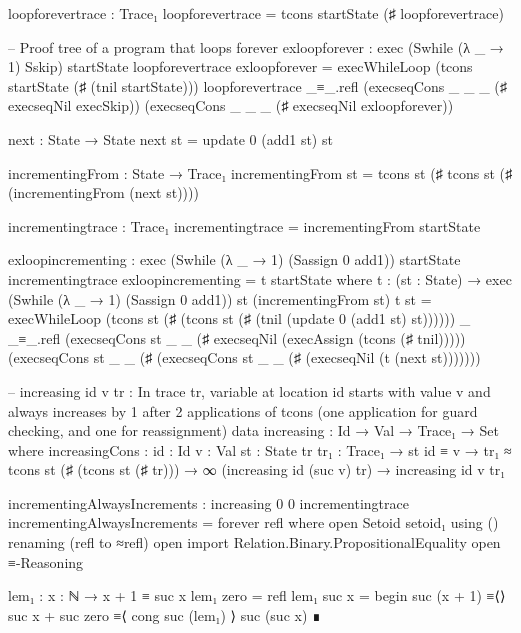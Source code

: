         loopforevertrace : Trace₁
        loopforevertrace = tcons startState (♯ loopforevertrace)
        
        -- Proof tree of a program that loops forever
        exloopforever : exec (Swhile (λ _ → 1) Sskip) startState loopforevertrace
        exloopforever = execWhileLoop 
            (tcons startState (♯ (tnil startState))) 
            loopforevertrace
            _≡_.refl 
            (execseqCons _ _ _ (♯ execseqNil execSkip))
            (execseqCons _ _ _ (♯ execseqNil exloopforever))

        next : State → State
        next st = update 0 (add1 st) st

        incrementingFrom : State → Trace₁
        incrementingFrom st = tcons st (♯ tcons st (♯ (incrementingFrom (next st))))

        incrementingtrace : Trace₁
        incrementingtrace = incrementingFrom startState

        exloopincrementing : exec (Swhile (λ _ → 1) (Sassign 0 add1)) startState incrementingtrace
        exloopincrementing = t startState
            where
                t : (st : State) → exec (Swhile (λ _ → 1) (Sassign 0 add1)) st (incrementingFrom st)
                t st = execWhileLoop 
                    (tcons st (♯ (tcons st (♯ (tnil (update 0 (add1 st) st)))))) 
                    _ 
                    _≡_.refl 
                    (execseqCons st _ _ (♯ execseqNil (execAssign (tcons (♯ tnil)))))
                    (execseqCons st _ _ (♯ (execseqCons st _ _ (♯ (execseqNil (t (next st)))))))


        -- increasing id v tr : In trace tr, variable at location id starts with value v and always increases by 1 after 2 applications of tcons (one application for guard checking, and one for reassignment)
        data increasing : Id → Val → Trace₁ → Set where
            increasingCons : {id : Id} {v : Val} {st : State} {tr tr₁ : Trace₁} 
                → st id ≡ v 
                → tr₁ ≈ tcons st (♯ (tcons st (♯ tr))) 
                → ∞ (increasing id (suc v) tr) 
                → increasing id v tr₁

        incrementingAlwaysIncrements : increasing 0 0 incrementingtrace
        incrementingAlwaysIncrements = forever refl
            where
                open Setoid setoid₁ using () renaming (refl to ≈refl)
                open import Relation.Binary.PropositionalEquality
                open ≡-Reasoning

                lem₁ : {x : ℕ} → x + 1 ≡ suc x
                lem₁ {zero} = refl
                lem₁ {suc x} = begin
                    suc (x + 1)
                    ≡⟨⟩
                    suc x + suc zero
                    ≡⟨ cong suc (lem₁) ⟩
                    suc (suc x)
                    ∎

